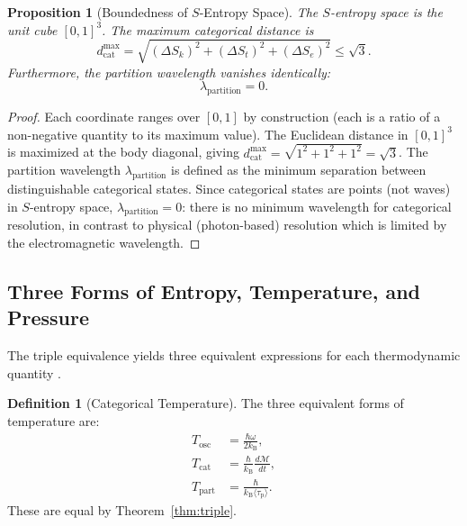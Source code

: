 \documentclass[11pt,twocolumn,a4paper]{article}
\theoremstyle{plain}
\newtheorem{proposition}[theorem]{Proposition}
\theoremstyle{definition}
\newtheorem{definition}[theorem]{Definition}
\theoremstyle{remark}
\newcommand{\Sk}{S_k}
\newcommand{\St}{S_t}
\newcommand{\Se}{S_e}
\newcommand{\kB}{k_{\mathrm{B}}}
\newcommand{\dcat}{d_{\mathrm{cat}}}
\newcommand{\Tcat}{T_{\mathrm{cat}}}
\newcommand{\Depth}{\mathcal{M}}
\newcommand{\taup}{\tau_{\mathrm{p}}}
\begin{document}
\begin{proposition}[Boundedness of $S$-Entropy Space]
\label{prop:bounded_sentropy}
The $S$-entropy space is the unit cube $[0,1]^3$. The maximum categorical distance is
\begin{equation}
\dcat^{\max} = \sqrt{(\Delta \Sk)^2 + (\Delta \St)^2 + (\Delta \Se)^2} \leq \sqrt{3}.
\label{eq:dcat_max}
\end{equation}
Furthermore, the partition wavelength vanishes identically:
\begin{equation}
\lambda_{\mathrm{partition}} = 0.
\label{eq:lambda_partition}
\end{equation}
\end{proposition}

\begin{proof}
Each coordinate ranges over $[0,1]$ by construction (each is a ratio of a non-negative quantity to its maximum value). The Euclidean distance in $[0,1]^3$ is maximized at the body diagonal, giving $\dcat^{\max} = \sqrt{1^2 + 1^2 + 1^2} = \sqrt{3}$. The partition wavelength $\lambda_{\mathrm{partition}}$ is defined as the minimum separation between distinguishable categorical states. Since categorical states are points (not waves) in $S$-entropy space, $\lambda_{\mathrm{partition}} = 0$: there is no minimum wavelength for categorical resolution, in contrast to physical (photon-based) resolution which is limited by the electromagnetic wavelength.
\end{proof}

\subsection{Three Forms of Entropy, Temperature, and Pressure}

The triple equivalence yields three equivalent expressions for each thermodynamic quantity \cite{sachikonye2026atmospheric, sachikonye2026equations}.

\begin{definition}[Categorical Temperature]
\label{def:cat_temp}
The three equivalent forms of temperature are:
\begin{align}
T_{\mathrm{osc}} &= \frac{\hbar \omega}{2\kB}, \label{eq:Tosc}\\
\Tcat &= \frac{\hbar}{\kB} \frac{d\Depth}{dt}, \label{eq:Tcat}\\
T_{\mathrm{part}} &= \frac{\hbar}{\kB \langle \taup \rangle}. \label{eq:Tpart}
\end{align}
These are equal by Theorem~\ref{thm:triple}.
\end{definition}
\end{document}

